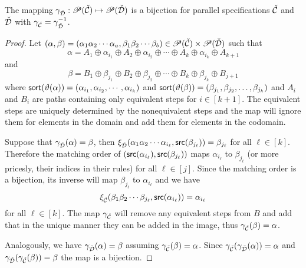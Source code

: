 \begin{proposition}
The mapping $\gamma_{\check{\mathcal{D}}}: \mathscr{P}(\check{\mathcal{C}}) \mapsto \mathscr{P}(\check{\mathcal{D}})$ is a bijection for parallel specifications $\check{\mathcal{C}}$ and $\check{\mathcal{D}}$ with $\gamma_{\check{\mathcal{C}}} = \gamma_{\check{\mathcal{D}}}^{-1}$.
\end{proposition}
\begin{proof}
Let $(\alpha,\beta) = (\alpha_1\alpha_2\dotsm\alpha_a,\beta_1\beta_2\dotsm\beta_b)\in \mathscr{P}(\check{\mathcal{C}}) \times \mathscr{P}(\check{\mathcal{D}})$ such that
\[
    \alpha = A_1 \oplus \alpha_{i_1} \oplus A_2 \oplus \alpha_{i_2} \oplus \dotsm \oplus A_k \oplus \alpha_{i_k} \oplus A_{k+1}
\]
and
\[
    \beta = B_1 \oplus \beta_{j_1} \oplus B_2 \oplus \beta_{j_2} \oplus \dotsm \oplus B_k \oplus \beta_{j_k} \oplus B_{j+1}
\]
where $\textsf{sort}(\vartheta(\alpha)) = (\alpha_{i_1},\alpha_{i_2},\dotsm,\alpha_{i_k})$ and $\textsf{sort}(\vartheta(\beta)) = (\beta_{j_1},\beta_{j_2},\dotsc,\beta_{j_k})$ and $A_i$ and $B_i$ are paths containing only equivalent steps for $i \in [k+1]$. The equivalent steps are uniquely determined by the nonequivalent steps and the map will ignore them for elements in the domain and add them for elements in the codomain.

Suppose that $\gamma_{\check{\mathcal{D}}}(\alpha) = \beta$, then $\xi_{\check{\mathcal{D}}}(\alpha_1\alpha_2\dotsm\alpha_{i_\ell},\textsf{src}(\beta_{j_\ell})) = \beta_{j_\ell}$ for all $\ell \in [k]$. Therefore the matching order of $(\textsf{src}(\alpha_{i_\ell}),\textsf{src}(\beta_{j_\ell}))$ maps $\alpha_{i_\ell}$ to $\beta_{j_\ell}$ (or more pricesly, their indices in their rules) for all $\ell\in[j]$. Since the matching order is a bijection, its inverse will map $\beta_{j_\ell}$ to $\alpha_{i_\ell}$ and we have
\[
    \xi_{\check{\mathcal{C}}}(\beta_1\beta_2\dotsm\beta_{j_\ell},\textsf{src}(\alpha_{i_\ell})) = \alpha_{i_\ell}
\]
for all $\ell \in [k]$. The map $\gamma_{\check{\mathcal{C}}}$ will remove any equivalent steps from $B$ and add that in the unique manner they can be added in the image, thus $\gamma_{\check{\mathcal{C}}}(\beta) = \alpha$.

Analogously, we have $\gamma_{\check{\mathcal{D}}}(\alpha) = \beta$ assuming $\gamma_{\check{\mathcal{C}}}(\beta) = \alpha$. Since $\gamma_{\check{\mathcal{C}}}(\gamma_{\check{\mathcal{D}}}(\alpha)) = \alpha$ and $\gamma_{\check{\mathcal{D}}}(\gamma_{\check{\mathcal{C}}}(\beta)) = \beta$ the map is a bijection.
\end{proof}

